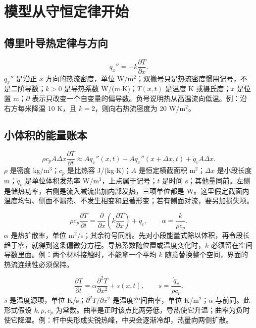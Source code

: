 \section{模型从守恒定律开始}
\subsection{傅里叶导热定律与方向}
\begin{equation}
q_x''=-k\frac{\partial T}{\partial x}.
\end{equation}
$q_x''$ 是沿正 $x$ 方向的热流密度，单位 W/m$^2$；双撇号只是热流密度惯用记号，不是二阶导数；$k>0$ 是导热系数 W/(m$\cdot$K)；$T(x,t)$ 是温度 K 或摄氏度；$x$ 是位置 m；$\partial$ 表示只改变一个自变量的偏导数。负号说明热从高温流向低温。例：沿右方每米降温 10 K，且 $k=2$，则向右热流密度为 20 W/m$^2$。

\subsection{小体积的能量账本}
\begin{equation}
\rho c_p A\Delta x\frac{\partial T}{\partial t}
\approx A q_x''(x,t)-A q_x''(x+\Delta x,t)+\dot q_v A\Delta x.
\end{equation}
$\rho$ 是密度 kg/m$^3$；$c_p$ 是比热容 J/(kg$\cdot$K)；$A$ 是恒定横截面积 m$^2$；$\Delta x$ 是小段长度 m；$\dot q_v$ 是单位体积发热率 W/m$^3$，上点属于记号；$t$ 是时间 s；其他量同前。左侧是储热功率，右侧是流入减流出加内部发热，三项单位都是 W。这里假定截面内温度均匀、侧面不漏热、不发生相变和显著形变；若有侧面对流，要另加损失项。

\begin{equation}
\rho c_p\frac{\partial T}{\partial t}=\frac{\partial}{\partial x}\left(k\frac{\partial T}{\partial x}\right)+\dot q_v,
\qquad \alpha=\frac{k}{\rho c_p}.
\end{equation}
$\alpha$ 是热扩散率，单位 m$^2$/s；其余符号同前。先对小段能量式除以体积，再令段长趋于零，就得到这条偏微分方程。导热系数随位置或温度变化时，$k$ 必须留在空间导数里面。例：两个材料接触时，不能拿一个平均 $k$ 随意替换整个空间，界面的热流连续性必须保持。

\begin{equation}
\frac{\partial T}{\partial t}=\alpha\frac{\partial^2 T}{\partial x^2}+s(x,t),\qquad s=\frac{\dot q_v}{\rho c_p}.
\end{equation}
$s$ 是温度源项，单位 K/s；$\partial^2 T/\partial x^2$ 是温度空间曲率，单位 K/m$^2$；$\alpha$ 与前同。此形式假设 $k,\rho,c_p$ 为常数。曲率是正时该点比两旁低，导热使它升温；曲率为负时使它降温。例：杆中央形成尖锐热峰，中央会逐渐冷却，热量向两侧扩散。

